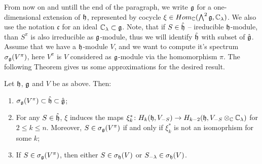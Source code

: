 From now on and untill the end of the paragraph, we write $\mathfrak{g}$ for a one-dimensional extension
of $\mathfrak{h}$, represented by cocycle $\xi \in Hom_{\mathbb{C}}(\bigwedge^2\mathfrak{g}, \mathbb{C}_\lambda)$. We also use
the notation $\mathfrak{c}$ for an ideal $\mathbb{C}_\lambda\subset \mathfrak{g}$. Note, that if $S \in
\hat{\mathfrak{h}}$ -- ireducible $\mathfrak{h}$-module, than $S^\pi$ is also irreducible as $\mathfrak{g}$-module, thus
we will identify $\hat{\mathfrak{h}}$ with subset of $\hat{\mathfrak{g}}$. Assume that we have a $\mathfrak{h}$-module $V$,
and we want to compute it's spectrum $\sigma_{\mathfrak{g}} (V^\pi)$, here $V^\pi$ is $V$ considered as
$\mathfrak{g}$-module via the homomorphism $\pi$. The following Theorem gives us some approximations for
the desired result.
\begin{theorem} \label{t:1ext}
    Let $\mathfrak{h}$, $\mathfrak{g}$ and $V$ be as above. Then:
    \begin{enumerate}
        \item $\sigma_{\mathfrak{g}}(V^\pi) \subset \hat{\mathfrak{h}} \subset \hat{\mathfrak{g}}$;

        \item For any $S \in \hat{\mathfrak{h}}$, $\xi$ induces the maps $\xi_k^* \colon H_k(\mathfrak{h}, V_{-S})
            \to H_{k - 2}(\mathfrak{h},  V_{-S}\otimes_{\mathbb{C}} \mathbb{C}_\lambda)$ for $2 \leq k \leq n$. Moreover, $S \in
            \sigma_{\mathfrak{g}}(V^\pi)$ if and only if $\xi^*_k$ is not an isomoprhism for some $k$;

        \item If $S\in \sigma_{\mathfrak{g}}(V^\pi)$, then either $S \in \sigma_{\mathfrak{h}}(V)$ or
            $S_{-\lambda}\in \sigma_{\mathfrak{h}}(V)$.
    \end{enumerate}
\end{theorem}
